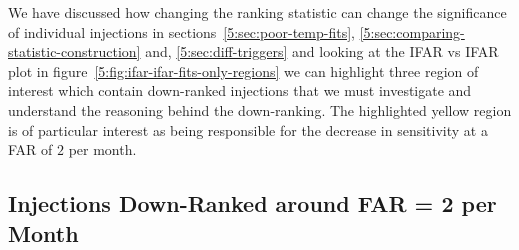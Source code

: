 We have discussed how changing the ranking statistic can change the significance of individual injections in sections~\ref{5:sec:poor-temp-fits}, \ref{5:sec:comparing-statistic-construction} and, \ref{5:sec:diff-triggers} and looking at the IFAR vs IFAR plot in figure~\ref{5:fig:ifar-ifar-fits-only-regions} we can highlight three region of interest which contain down-ranked injections that we must investigate and understand the reasoning behind the down-ranking. The highlighted yellow region is of particular interest as being responsible for the decrease in sensitivity at a FAR of $2$ per month.

\subsection{\label{5:sec:bottom-left-region}Injections Down-Ranked around FAR = 2 per Month}

